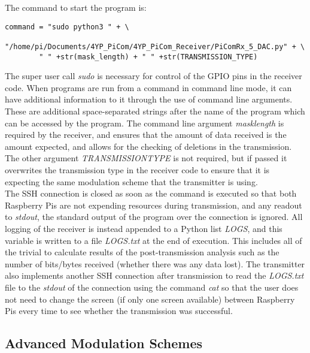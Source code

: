 \documentclass[../main.tex]{subfiles}
\begin{document}
The command to start the program is:

\begin{lstlisting}[caption=Command Line to Start the Receiver]
	command = "sudo python3 " + \
		"/home/pi/Documents/4YP_PiCom/4YP_PiCom_Receiver/PiComRx_5_DAC.py" + \
		" " +str(mask_length) + " " +str(TRANSMISSION_TYPE)
\end{lstlisting}

The super user call \textit{sudo} is necessary for control of the GPIO pins in the receiver code.
When programs are run from a command in command line mode, it can have additional information to it through the use of command line arguments.
These are additional space-separated strings after the name of the program which can be accessed by the program.
The command line argument \textit{mask\textunderscore length} is required by the receiver, and ensures that the amount of data received is the amount expected, and allows for the checking of deletions in the transmission.
The other argument \textit{TRANSMISSION\textunderscore TYPE} is not required, but if passed it overwrites the transmission type in the receiver code to ensure that it is expecting the same modulation scheme that the transmitter is using.\\

The SSH connection is closed as soon as the command is executed so that both Raspberry Pis are not expending resources during transmission, and any readout to \textit{stdout}, the standard output of the program over the connection is ignored.
All logging of the receiver is instead appended to a Python list \textit{LOGS}, and this variable is written to a file \textit{LOGS.txt} at the end of execution.
This includes all of the trivial to calculate results of the post-transmission analysis such as the number of bits/bytes received (whether there was any data lost).
\todo[inline]{Clearly check below once done}
The transmitter also implements another SSH connection after transmission to read the \textit{LOGS.txt} file to the \textit{stdout} of the connection using the command \textit{cat} so that the user does not need to change the screen (if only one screen available) between Raspberry Pis every time to see whether the transmission was successful.\\

\subsection{Advanced Modulation Schemes} \label{sec_Advanced Modulation Schemes}
\end{document}
